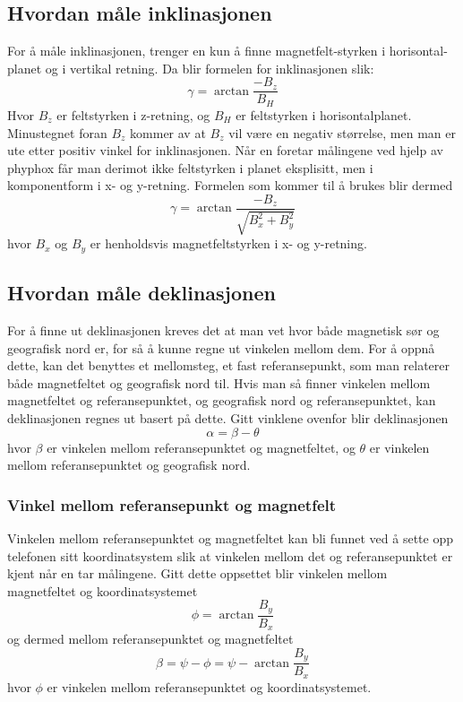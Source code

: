 \subsection{Hvordan måle inklinasjonen}
For å måle inklinasjonen, trenger en kun å finne magnetfelt-styrken i horisontal-
planet og i vertikal retning. Da blir formelen for inklinasjonen slik:
\begin{equation}
    \gamma = \arctan \frac{-B_z}{B_H}
\end{equation}
Hvor $B_z$ er feltstyrken i z-retning, og $B_H$ er feltstyrken i horisontalplanet. 
Minustegnet foran $B_z$ kommer av at $B_z$ vil være en negativ størrelse, men man er ute etter 
positiv vinkel for inklinasjonen. Når en foretar målingene ved hjelp av 
phyphox får man derimot ikke feltstyrken i planet eksplisitt, men i komponentform i 
x- og y-retning. Formelen som kommer til å brukes blir dermed
\begin{equation}
    \gamma = \arctan{ \frac{-B_z}{\sqrt{B_x^2 + B_y^2}} }
\end{equation}
hvor $B_x$ og $B_y$ er henholdsvis magnetfeltstyrken i x- og y-retning.

\subsection{Hvordan måle deklinasjonen}
For å finne ut deklinasjonen kreves det at man vet hvor både magnetisk sør og 
geografisk nord er, for så å kunne regne ut vinkelen mellom dem. For å oppnå dette, 
kan det benyttes et mellomsteg, et fast referansepunkt, som man relaterer både 
magnetfeltet og geografisk nord til. Hvis man så finner vinkelen mellom magnetfeltet 
og referansepunktet, og geografisk nord og referansepunktet, kan deklinasjonen 
regnes ut basert på dette. Gitt vinklene ovenfor blir deklinasjonen
\begin{equation}
    \alpha = \beta - \theta
\end{equation}
hvor $\beta$ er vinkelen mellom referansepunktet og magnetfeltet, og $\theta$ er 
vinkelen mellom referansepunktet og geografisk nord.

\subsubsection{Vinkel mellom referansepunkt og magnetfelt}
Vinkelen mellom referansepunktet og magnetfeltet kan bli funnet ved å sette opp 
telefonen sitt koordinatsystem slik at vinkelen mellom det og referansepunktet er 
kjent når en tar målingene. Gitt dette oppsettet blir vinkelen mellom magnetfeltet 
og koordinatsystemet
\begin{equation}
    \phi = \arctan \frac{B_y}{B_x}
\end{equation}
og dermed mellom referansepunktet og magnetfeltet
\begin{equation}
    \beta = \psi - \phi = \psi - \arctan \frac{B_y}{B_x}
\end{equation}
hvor $\phi$ er vinkelen mellom referansepunktet og koordinatsystemet.

